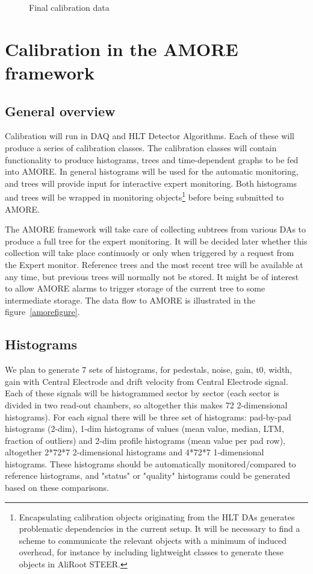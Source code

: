 \documentclass[a4paper,12pt]{article}
\begin{document}
\begin{figure}
  \centering{}
  \caption{Final calibration data}
  \label{figcalib}
\end{figure}


\section{Calibration in the AMORE framework}
\subsection{General overview}

Calibration will run in DAQ and HLT Detector Algorithms. Each of these will
produce a series of calibration classes. The calibration classes will contain
functionality to produce histograms, trees and time-dependent graphs to be fed
into AMORE. In general histograms will be used for the automatic monitoring,
and trees will provide input for interactive expert monitoring. Both histograms 
and trees will be wrapped in monitoring objects\footnote{Encapsulating calibration
objects originating from the HLT DAs generates problematic dependencies in the 
current setup. It will be necessary to find a scheme to communicate the relevant 
objects with a minimum of induced overhead, for instance by including 
lightweight classes to generate these objects in AliRoot STEER.} 
before being submitted to AMORE. 

The AMORE framework will take care of collecting subtrees from various DAs to 
produce a full tree for the expert monitoring. It will be decided later whether 
this collection will take place continuosly or only when triggered by a request 
from the Expert monitor.  Reference trees and the most recent tree will be 
available at any time, but previous trees will normally not be stored. It might 
be of interest to allow AMORE alarms to trigger storage of the current tree to 
some intermediate storage. The data flow to AMORE is illustrated in the
figure~\ref{amorefigure}.

\subsection{Histograms}
We plan to generate 7 sets of histograms, for pedestals, noise, gain, t0, width,
gain with Central Electrode and drift velocity from Central Electrode signal.  
Each of these signals will be histogrammed sector by sector (each sector is 
divided in two read-out chambers, so altogether this makes 72 2-dimensional 
histograms). For each signal there will be three set of histograms: pad-by-pad 
histograms (2-dim), 1-dim histograms of values (mean value, median, LTM, 
fraction of outliers) and 2-dim profile histograms (mean value per pad row), 
altogether 2*72*7 2-dimensional histograms and 4*72*7 1-dimensional histograms. 
These histograms should be automatically monitored/compared to reference 
histograms, and "status" or "quality" histograms could be generated based on 
these comparisons.
\end{document}
